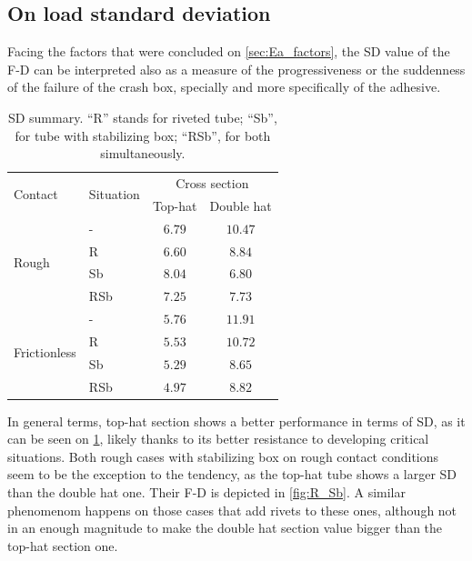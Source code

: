 \documentclass[
documentsize = a4, %
font = cmr, %
typesize = 11, %
printmode = true,
onehalfspacing = true,
language = en, %
titlepage = udciccp, %
degree = pt, %
dedication = true,
acknowledgements = true,
abstract-en = true,
abstract-es = false,
abstract-ga = false,
epigraphs = true,
toc = true,
lof = true,
lot = true,
frontmatterintoc = false,
notation = false,
minimal = false,
]{UDCthesis}
\begin{document}
\subsection{On load standard deviation}

Facing the factors that were concluded on \cref{sec:Ea_factors}, the \gls{SD} value of the \gls{F-D} can be interpreted also as a measure of the progressiveness or the suddenness of the failure of the crash box, specially and more specifically of the adhesive.

\begin{table}[htpb]
	\centering
	\begin{tabular}{llcc}
		\toprule
		\multirow{2}{*}{Contact} & \multirow{2}{*}{Situation} & \multicolumn{2}{c}{Cross section} \\ \cmidrule{3-4}
		\multicolumn{2}{l}{}                                    & Top-hat         & Double hat      \\ \midrule
		\multirow{4}{*}{Rough}                  & -             & $6.79$          & $10.47$         \\
		& R             & $6.60$          & $8.84$          \\
		& Sb            & $8.04$          & $6.80$          \\
		& RSb           & $7.25$          & $7.73$          \\ \midrule
		\multirow{4}{*}{Frictionless}           & -             & $5.76$          & $11.91$         \\
		& R             & $5.53$          & $10.72$         \\
		& Sb            & $5.29$          & $8.65$          \\
		& RSb           & $4.97$          & $8.82$          \\ \bottomrule
	\end{tabular}
	\caption[\Acrlong{SD} summary.]{\Acrlong{SD} summary. ``R'' stands for riveted tube; ``Sb'', for tube with stabilizing box; ``RSb'', for both simultaneously.}
	\label{tab:standard_dev}
\end{table}

In general terms, top-hat section shows a better performance in terms of \gls{SD}, as it can be seen on \cref{tab:standard_dev}, likely thanks to its better resistance to developing critical situations. Both rough cases with stabilizing box on rough contact conditions seem to be the exception to the tendency, as the top-hat tube shows a larger \gls{SD} than the double hat one. Their \gls{F-D} is depicted in \cref{fig:R_Sb}. A similar phenomenom happens on those cases that add rivets to these ones, although not in an enough magnitude to make the double hat section value bigger than the top-hat section one.
\end{document}
